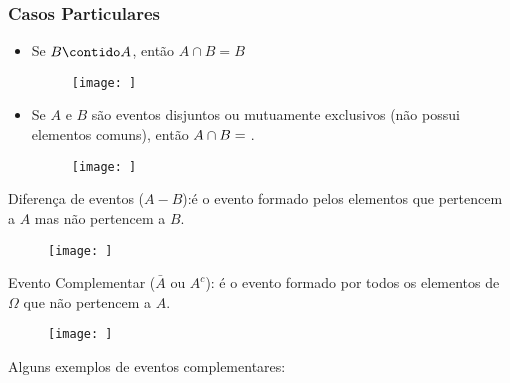 \documentclass[11pt,a4paper]{book}
\begin{document}
\subsubsection{Casos Particulares}
\begin{itemize}
  \item Se $B \contido A$, então $A \cap B= B$ 
    \begin{figure}[]
      \centering
      \texttt{[image: ]}
        \caption{}
        \label{figura:3}
      \end{figure}

      \item Se $A$ e $B$ são eventos disjuntos ou mutuamente exclusivos (não possui elementos comuns), então $A\cap B = \null$.
        \begin{figure}[]
          \centering
          \texttt{[image: ]}
            \caption{}
            \label{figura:4}
          \end{figure}

\end{itemize}
Diferença de eventos ($A-B$):é o evento formado pelos elementos que pertencem a $A$ mas não pertencem a $B$.
\begin{figure}[]
  \centering
  \texttt{[image: ]}
    \caption{}
    \label{figura:5}
  \end{figure}
 Evento Complementar ($\bar{A}$ ou $A^c$): é o evento formado por todos os elementos de $\Omega$ que não pertencem a $A$.
 \begin{figure}[]
   \centering
   \texttt{[image: ]}
     \caption{}
     \label{figura:6}
   \end{figure}

   Alguns exemplos de eventos complementares: 
\end{document}
